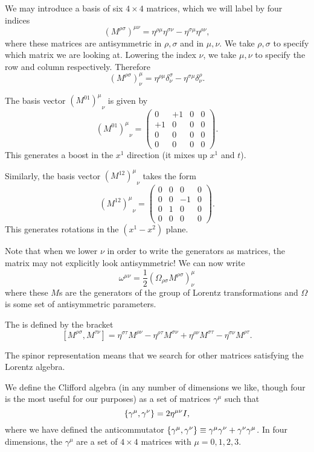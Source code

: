We may introduce a basis of six $4\times 4$ matrices, which we will label by four indices
$$(M^{\rho\sigma})^{\mu\nu}=\eta^{\rho\mu}\eta^{\sigma\nu}-\eta^{\sigma\mu}\eta^{\rho\nu},$$
where these matrices are antisymmetric in $\rho,\sigma$ and in $\mu,\nu$. We take $\rho,\sigma$ to specify which matrix we are looking at. Lowering the index $\nu$, we take $\mu,\nu$ to specify the row and column respectively. Therefore
$$(M^{\rho\sigma})^\mu_\nu=\eta^{\rho\mu}\delta^\sigma_\nu-\eta^{\sigma\mu}\delta^\rho_\nu.$$
\begin{exm}
The basis vector ${(M^{01})^\mu}_\nu$ is given by
$${(M^{01})^\mu}_\nu=
\begin{pmatrix}
0&+1&0&0\\
+1&0&0&0\\
0&0&0&0\\
0&0&0&0
\end{pmatrix}.$$
This generates a boost in the $x^1$ direction (it mixes up $x^1$ and $t$).

Similarly, the basis vector ${(M^{12})^\mu}_\nu$ takes the form
$${(M^{12})^\mu}_\nu=
\begin{pmatrix}
0&0&0&0\\
0&0&-1&0\\
0&1&0&0\\
0&0&0&0
\end{pmatrix}.$$
This generates rotations in the $(x^1-x^2)$ plane.
\end{exm}
Note that when we lower $\nu$ in order to write the generators as matrices, the matrix may not explicitly look antisymmetric! We can now write
$$\omega^{\mu\nu}=\frac{1}{2}(\Omega_{\rho\sigma}M^{\rho\sigma})^\mu_\nu$$
where these $M$s are the generators of the group of Lorentz transformations and $\Omega$ is some set of antisymmetric parameters.
\begin{defn}
The  is defined by the bracket
$$[M^{\rho\sigma},M^{\tau\nu}]=\eta^{\sigma\tau}M^{\rho\nu}-\eta^{\rho\tau}M^{\sigma\nu}+\eta^{\rho\nu}M^{\sigma\tau}-\eta^{\sigma\nu}M^{\rho\tau}.$$
\end{defn}

The spinor representation means that we search for other matrices satisfying the Lorentz algebra. 
\begin{defn}
We define the Clifford algebra (in any number of dimensions we like, though four is the most useful for our purposes) as a set of matrices $\gamma^\mu$ such that
$$\{\gamma^\mu,\gamma^\nu\}=2\eta^{\mu\nu} I,$$
where we have defined the anticommutator $\{\gamma^\mu,\gamma^\nu\}\equiv\gamma^\mu \gamma^\nu+\gamma^\nu\gamma^\mu$. In four dimensions, the $\gamma^\mu$ are a set of $4\times 4$ matrices with $\mu=0,1,2,3$.
\end{defn}

